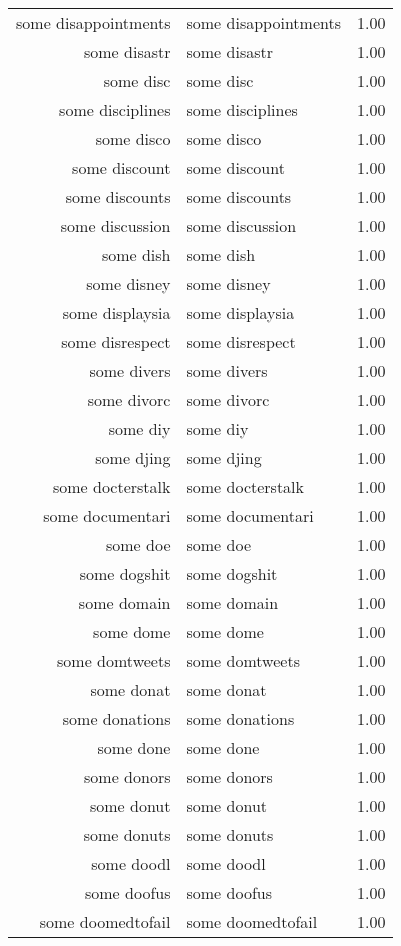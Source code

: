 \begin{table}[ht]
\begin{tabular}{rlr}
  some disappointments & some disappointments & 1.00 \\ 
  some disastr & some disastr & 1.00 \\ 
  some disc & some disc & 1.00 \\ 
  some disciplines & some disciplines & 1.00 \\ 
  some disco & some disco & 1.00 \\ 
  some discount & some discount & 1.00 \\ 
  some discounts & some discounts & 1.00 \\ 
  some discussion & some discussion & 1.00 \\ 
  some dish & some dish & 1.00 \\ 
  some disney & some disney & 1.00 \\ 
  some displaysia & some displaysia & 1.00 \\ 
  some disrespect & some disrespect & 1.00 \\ 
  some divers & some divers & 1.00 \\ 
  some divorc & some divorc & 1.00 \\ 
  some diy & some diy & 1.00 \\ 
  some djing & some djing & 1.00 \\ 
  some docterstalk & some docterstalk & 1.00 \\ 
  some documentari & some documentari & 1.00 \\ 
  some doe & some doe & 1.00 \\ 
  some dogshit & some dogshit & 1.00 \\ 
  some domain & some domain & 1.00 \\ 
  some dome & some dome & 1.00 \\ 
  some domtweets & some domtweets & 1.00 \\ 
  some donat & some donat & 1.00 \\ 
  some donations & some donations & 1.00 \\ 
  some done & some done & 1.00 \\ 
  some donors & some donors & 1.00 \\ 
  some donut & some donut & 1.00 \\ 
  some donuts & some donuts & 1.00 \\ 
  some doodl & some doodl & 1.00 \\ 
  some doofus & some doofus & 1.00 \\ 
  some doomedtofail & some doomedtofail & 1.00 \\ 

\end{tabular}
\end{table}
